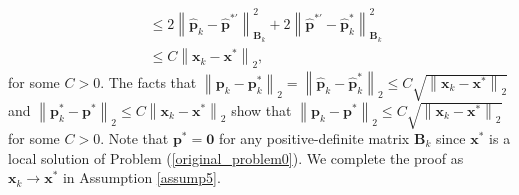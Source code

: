 \documentclass[aos]{imsart}
\numberwithin{equation}{section}
\theoremstyle{plain}
\begin{document}
\begin{appendix}
\begin{equation}
\begin{split}
            & \leq 2 \left\| \hat{\bm{p}}_{k} -\hat{\bm{p}}^{* \prime}  \right\|_{\bm{B}_{k}}^2 + 2 \left\| \hat{\bm{p}}^{* \prime} - \hat{\bm{p}}_{k}^{*} \right\|_{\bm{B}_{k}}^2 \\
            & \leq C \left\| \bm{x}_{k} - \bm{x}^{*} \right\|_2,
        \end{split}
    \end{equation}
    for some $C > 0$. The facts that $\left \| \bm{p}_{k} - \bm{p}_{k}^{*} \right\|_2 = \left \| \hat{\bm{p}}_{k} - \hat{\bm{p}}_{k}^{*} \right\|_2 \leq C \sqrt{\left\| \bm{x}_{k} - \bm{x}^{*} \right\|_2}$ and $\left\| \bm{p}_{k}^{*} - \bm{p}^{*} \right\|_2 \leq C \left\| \bm{x}_{k} - \bm{x}^{*} \right\|_2$ show that $\left \| \bm{p}_{k} - \bm{p}^{*} \right\|_2  \leq C \sqrt{\left\| \bm{x}_{k} - \bm{x}^{*} \right\|_2}$ for some $C > 0$. Note that $\bm{p}^{*} = \bm{0}$ for any positive-definite matrix $\bm{B}_{k}$ since $\bm{x}^{*}$ is a local solution of Problem (\ref{original_problem0}). We complete the proof as $\bm{x}_{k} \to \bm{x}^{*}$ in Assumption \ref{assump5}. 


\end{appendix}
\end{document}
